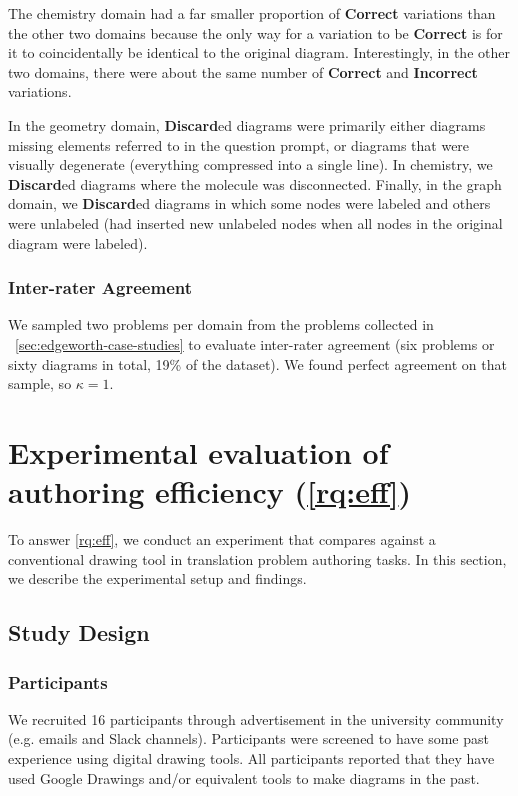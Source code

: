 The chemistry domain had a far smaller proportion of \textbf{Correct} variations than the other two domains because the only way for a variation to be \textbf{Correct} is for it to coincidentally be identical to the original diagram. Interestingly, in the other two domains, there were about the same number of \textbf{Correct} and \textbf{Incorrect} variations.

In the geometry domain, \textbf{Discard}ed diagrams were primarily either diagrams missing elements referred to in the question prompt, or diagrams that were visually degenerate (\eg everything compressed into a single line). In chemistry, we \textbf{Discard}ed diagrams where the molecule was disconnected. Finally, in the graph domain, we \textbf{Discard}ed diagrams in which some nodes were labeled and others were unlabeled (\ie \Edgeworth had inserted new unlabeled nodes when all nodes in the original diagram were labeled).

\subsubsection{Inter-rater Agreement}

We sampled two problems per domain from the problems collected in ~\cref{sec:edgeworth-case-studies} to evaluate inter-rater agreement (six problems or sixty diagrams in total, 19\% of the dataset). We found perfect agreement on that sample, so $\kappa = 1$.

\section{Experimental evaluation of authoring efficiency (\ref{rq:eff})}
\label{sec:edgeworth-user-study}

To answer \ref{rq:eff}, we conduct an experiment that compares \Edgeworth against a conventional drawing tool in translation problem authoring tasks. In this section, we describe the experimental setup and findings.

\subsection{Study Design}


\subsubsection{Participants}

We recruited 16 participants through advertisement in the university community (e.g. emails and Slack channels). Participants were screened to have some past experience using digital drawing tools. All participants reported that they have used Google Drawings and/or equivalent tools to make diagrams in the past.


